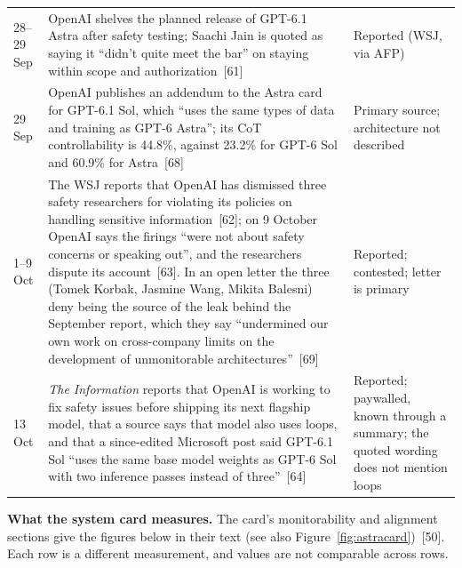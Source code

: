 \documentclass[11pt,letterpaper]{article}
\begin{document}
{\begin{longtable}{L{1.45cm} L{10.6cm} L{3.9cm}}
28--29 Sep & OpenAI shelves the planned release of GPT-6.1 Astra after safety testing; Saachi Jain is quoted as saying it ``didn't quite meet the bar'' on staying within scope and authorization~[61] & Reported (WSJ, via AFP) \\
29 Sep & OpenAI publishes an addendum to the Astra card for GPT-6.1 Sol, which ``uses the same types of data and training as GPT-6 Astra''; its CoT controllability is 44.8\%, against 23.2\% for GPT-6 Sol and 60.9\% for Astra~[68] & Primary source; architecture not described \\
1--9 Oct & The WSJ reports that OpenAI has dismissed three safety researchers for violating its policies on handling sensitive information~[62]; on 9 October OpenAI says the firings ``were not about safety concerns or speaking out'', and the researchers dispute its account~[63]. In an open letter the three (Tomek Korbak, Jasmine Wang, Mikita Balesni) deny being the source of the leak behind the September report, which they say ``undermined our own work on cross-company limits on the development of unmonitorable architectures''~[69] & Reported; contested; letter is primary \\
13 Oct & \emph{The Information} reports that OpenAI is working to fix safety issues before shipping its next flagship model, that a source says that model also uses loops, and that a since-edited Microsoft post said GPT-6.1 Sol ``uses the same base model weights as GPT-6 Sol with two inference passes instead of three''~[64] & Reported; paywalled, known through a summary; the quoted wording does not mention loops \\
\end{longtable}
}

\textbf{What the system card measures.} The card's monitorability and alignment sections give the figures below in their text (see also Figure~\ref{fig:astracard})~[50]. Each row is a different measurement, and values are not comparable across rows.
\end{document}
